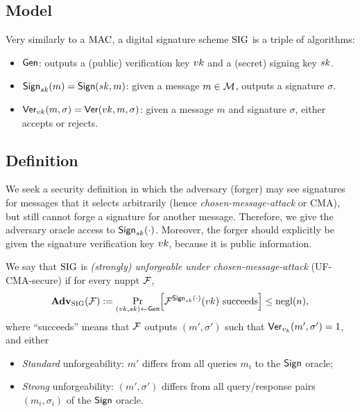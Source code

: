 \documentclass[11pt]{article}
\begin{document}
\subsection{Model}
\label{sec:model}

Very similarly to a $\text{MAC}$, a digital signature scheme $\text{SIG}$ is a
triple of algorithms:

\begin{itemize}
\item $\mathsf{Gen}$: outputs a (public) verification key $vk$ and a
  (secret) signing key $sk$.
\item $\mathsf{Sign}_{sk}(m) = \mathsf{Sign}(sk,m)$: given a message $m \in
  \mathcal{M}$, outputs a signature $\sigma$.
\item $\mathsf{Ver}_{vk}(m,\sigma) = \mathsf{Ver}(vk,m,\sigma)$: given a
  message $m$ and signature $\sigma$, either accepts or rejects.
\end{itemize}

\subsection{Definition}
\label{sec:uf-cma-definition}

We seek a security definition in which the adversary (forger) may see
signatures for messages that it selects arbitrarily (hence
\textit{chosen-message-attack} or CMA), but still cannot forge a
signature for another message.  Therefore, we give the adversary
oracle access to $\mathsf{Sign}_{sk}(\cdot)$.  Moreover, the forger should
explicitly be given the signature verification key $vk$, because it
is public information.

\begin{definition}
  \label{def:uf-cma-sig}
  We say that $\text{SIG}$ is \emph{(strongly) unforgeable under
    chosen-message-attack} (UF-CMA-secure) if for every nuppt $\mathcal{F}$,
  \[ \advan_{\sig}(\For) := \Pr_{(\vk,\sk) \gets \siggen}
  \bracks*{\For^{\sigsign_{\sk}(\cdot)}(\vk) \text{ succeeds}} \leq
  \negl(n), \] where ``succeeds'' means that $\mathcal{F}$ outputs $(m' ,
  \sigma')$ such that $\mathsf{Ver}_{v_{k}}(m' , \sigma') = 1$, and either
  \begin{itemize}
  \item \emph{Standard} unforgeability: $m'$ differs from all queries
    $m_{i}$ to the $\mathsf{Sign}$ oracle;
  \item \emph{Strong} unforgeability: $(m', \sigma')$ differs from all
    query/response pairs $(m_{i}, \sigma_{i})$ of the $\mathsf{Sign}$
    oracle.
  \end{itemize}
\end{definition}
\end{document}
